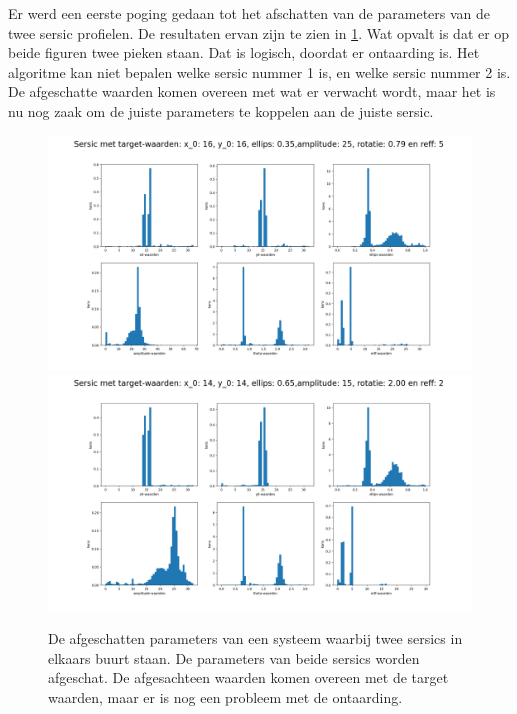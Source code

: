 Er werd een eerste poging gedaan tot het afschatten van de parameters van de twee sersic profielen. De resultaten ervan zijn te zien in \cref{fig: 2 sersic}. Wat opvalt is dat er op beide figuren twee pieken staan. Dat is logisch, doordat er ontaarding is. Het algoritme kan niet bepalen welke sersic nummer 1 is, en welke sersic nummer 2 is. De afgeschatte waarden komen overeen met wat er verwacht wordt, maar het is nu nog zaak om de juiste parameters te koppelen aan de juiste sersic.
\begin{figure}
    \begin{minipage}{0.98\linewidth}
    \includegraphics[width=0.95\linewidth]{Figures/1_emcee_hist_1200000_400000 (1).png}
    \includegraphics[width=0.95\linewidth]{Figures/2_emcee_hist_1200000_400000 (1).png}
    \end{minipage}
    \caption{De afgeschatten parameters van een systeem waarbij twee sersics in elkaars buurt staan. De parameters van beide sersics worden afgeschat. De afgesachteen waarden komen overeen met de target waarden, maar er is nog een probleem met de ontaarding.}
    \label{fig: 2 sersic}
\end{figure}
